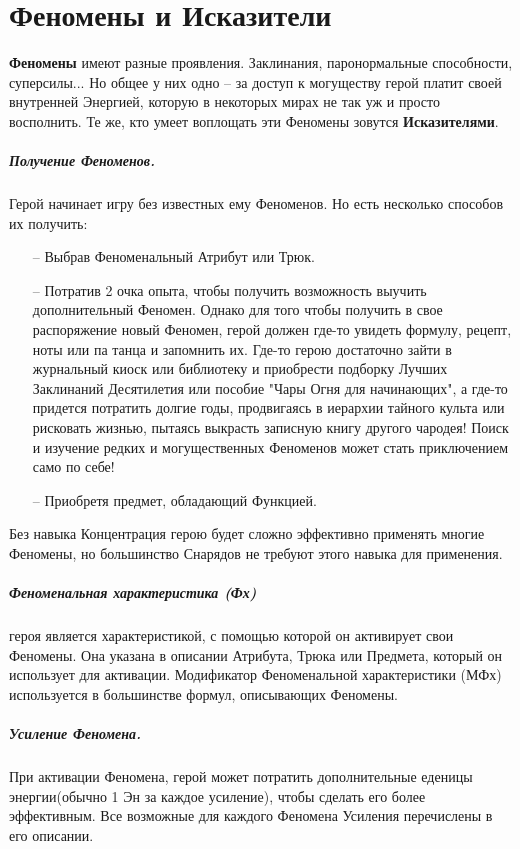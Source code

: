 \chapter{Феномены и Исказители}
\textbf{Феномены} имеют разные проявления. Заклинания, паронормальные способности, суперсилы... Но общее у них одно -- за доступ к могуществу герой платит своей внутренней Энергией, которую в некоторых мирах не так уж и просто восполнить. Те же, кто умеет воплощать эти Феномены зовутся \textbf{Исказителями}.
\paragraph{Получение Феноменов.} Герой начинает игру без известных ему Феноменов. Но есть несколько способов их получить:
\begin{itemize}
\item[--] Выбрав Феноменальный Атрибут или Трюк.
\item[--] Потратив 2 очка опыта, чтобы получить возможность выучить дополнительный Феномен.
\newline
Однако для того чтобы получить в свое распоряжение новый Феномен, герой должен где-то увидеть формулу, рецепт, ноты или па танца и запомнить их. Где-то герою достаточно зайти в журнальный киоск или библиотеку и приобрести подборку Лучших Заклинаний Десятилетия или пособие "Чары Огня для начинающих", а где-то придется потратить долгие годы, продвигаясь в иерархии тайного культа или рисковать жизнью, пытаясь выкрасть записную книгу другого чародея! Поиск и изучение редких и могущественных Феноменов может стать приключением само по себе!
\item[--] Приобретя предмет, обладающий Функцией.
\end{itemize}
\begin{tcolorbox}
Без навыка Концентрация герою будет сложно эффективно применять многие Феномены, но большинство Снарядов не требуют этого навыка для применения.
\end{tcolorbox}
\paragraph{Феноменальная характеристика (Фх)} героя является характеристикой, с помощью которой он активирует свои Феномены. Она указана в описании Атрибута, Трюка или Предмета, который он использует для активации. Модификатор Феноменальной характеристики (МФх) используется в большинстве формул, описывающих Феномены.
\paragraph{Усиление Феномена.} При активации Феномена, герой может потратить дополнительные еденицы энергии(обычно 1 Эн за каждое усиление), чтобы сделать его более эффективным. Все возможные для каждого Феномена Усиления перечислены в его описании.
